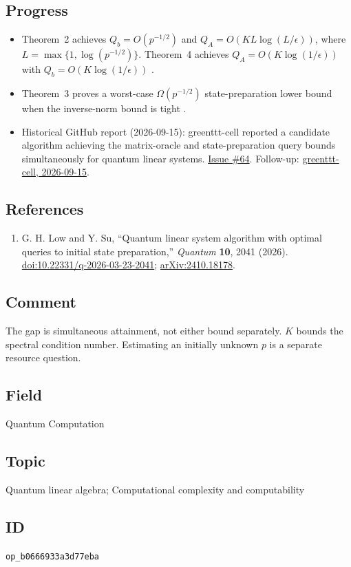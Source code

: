 \subsection*{Progress}

\begin{itemize}
  \item Theorem~2 achieves $Q_b=O(p^{-1/2})$ and $Q_A=O(KL\log(L/\epsilon))$, where $L=\max\{1,\log(p^{-1/2})\}$. Theorem~4 achieves $Q_A=O(K\log(1/\epsilon))$ with $Q_b=O(K\log(1/\epsilon))$ .

  \item Theorem~3 proves a worst-case $\Omega(p^{-1/2})$ state-preparation lower bound when the inverse-norm bound is tight .

  \item Historical GitHub report (2026-09-15): greenttt-cell reported a candidate algorithm achieving the matrix-oracle and state-preparation query bounds simultaneously for quantum linear systems. \href{https://github.com/Naixu-Guo/quantum-open-problems/issues/64}{Issue \#64}. Follow-up: \href{https://github.com/Naixu-Guo/quantum-open-problems/issues/64#issuecomment-5681906214}{greenttt-cell, 2026-09-15}.
\end{itemize}

\subsection*{References}

\begin{enumerate}[label={},leftmargin=4.8em,labelsep=0.5em]
  \footnotesize
  \item[\textup{[LS26]}]\label{ref:qlsboth-low-su}
  G. H. Low and Y. Su, ``Quantum linear system algorithm with optimal queries to initial state preparation,'' \emph{Quantum} \textbf{10}, 2041 (2026).
\href{https://doi.org/10.22331/q-2026-03-23-2041}{doi:10.22331/q-2026-03-23-2041};
\href{https://arxiv.org/abs/2410.18178}{arXiv:2410.18178}.
\end{enumerate}

\subsection*{Comment}

The gap is simultaneous attainment, not either bound separately. $K$ bounds the spectral condition number. Estimating an initially unknown $p$ is a separate resource question.

\subsection*{Field}

Quantum Computation

\subsection*{Topic}

Quantum linear algebra; Computational complexity and computability

\subsection*{ID}

\texttt{op\_b0666933a3d77eba}
